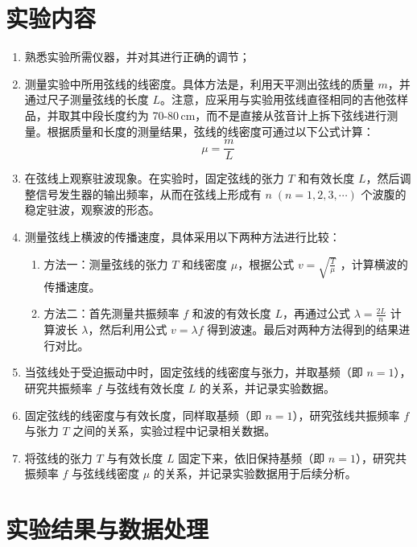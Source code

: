 \documentclass[UTF-8,twoside,cs4size]{ctexart}
\begin{document}
\section{实验内容}
\begin{enumerate}
    \item 熟悉实验所需仪器，并对其进行正确的调节；
    
    \item 测量实验中所用弦线的线密度。具体方法是，利用天平测出弦线的质量 $m$，并通过尺子测量弦线的长度 $L$。注意，应采用与实验用弦线直径相同的吉他弦样品，并取其中段长度约为 70-80\,cm，而不是直接从弦音计上拆下弦线进行测量。根据质量和长度的测量结果，弦线的线密度可通过以下公式计算：
    \[
    \mu = \frac{m}{L}
    \]
    
    \item 在弦线上观察驻波现象。在实验时，固定弦线的张力 $T$ 和有效长度 $L$，然后调整信号发生器的输出频率，从而在弦线上形成有 $n\;(n=1,2,3,\cdots)$ 个波腹的稳定驻波，观察波的形态。
    
    \item 测量弦线上横波的传播速度，具体采用以下两种方法进行比较：
    \begin{enumerate}
        \item 方法一：测量弦线的张力 $T$ 和线密度 $\mu$，根据公式 $v=\sqrt{\frac{T}{\mu}}$ ，计算横波的传播速度。
        \item 方法二：首先测量共振频率 $f$ 和波的有效长度 $L$，再通过公式 $\lambda = \frac{2L}{n}$ 计算波长 $\lambda$，然后利用公式 $v = \lambda f$ 得到波速。最后对两种方法得到的结果进行对比。
    \end{enumerate}
    
    \item 当弦线处于受迫振动中时，固定弦线的线密度与张力，并取基频（即 $n=1$），研究共振频率 $f$ 与弦线有效长度 $L$ 的关系，并记录实验数据。
    
    \item 固定弦线的线密度与有效长度，同样取基频（即 $n=1$），研究弦线共振频率 $f$ 与张力 $T$ 之间的关系，实验过程中记录相关数据。

    \item 将弦线的张力 $T$ 与有效长度 $L$ 固定下来，依旧保持基频（即 $n=1$），研究共振频率 $f$ 与弦线线密度 $\mu$ 的关系，并记录实验数据用于后续分析。
\end{enumerate}

\section{实验结果与数据处理}
\end{document}
